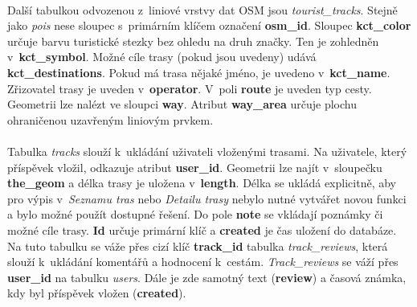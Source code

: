 \documentclass[11pt,a4paper,titlepage,oneside]{book}
\begin{document}
                        \paragraph{} Další tabulkou odvozenou z~liniové vrstvy dat \ac{OSM} jsou \textit{tourist\_tracks}. Stejně jako \textit{pois} nese sloupec s~primárním klíčem označení \textbf{osm\_id}. Sloupec \textbf{kct\_color} určuje barvu turistické stezky bez ohledu na druh značky. Ten je zohledněn v~\textbf{kct\_symbol}. Možné cíle trasy (pokud jsou uvedeny) udává \textbf{kct\_destinations}. Pokud má trasa nějaké jméno, je uvedeno v~\textbf{kct\_name}. Zřizovatel trasy je uveden v~\textbf{operator}. V~poli \textbf{route} je uveden typ cesty. Geo\-metrii lze nalézt ve sloupci \textbf{way}. Atribut \textbf{way\_area} určuje plochu ohrani\-čenou uzavřeným liniovým prvkem.



			\paragraph{} Tabulka \textit{tracks} slouží k~ukládání uživateli vloženými trasami. Na uživatele, který příspěvek vložil, odkazuje atribut \textbf{user\_id}. Geometrii lze najít v~slou\-pečku \textbf{the\_geom} a délka trasy je uložena v~\textbf{length}. Délka se ukládá explicitně, aby pro výpis v~\textit{Seznamu tras} nebo \textit{Detailu trasy} nebylo nutné vytvářet novou funkci a bylo možné použít dostupné řešení.  Do pole \textbf{note} se vkládají poznámky či možné cíle trasy. \textbf{Id} určuje primární klíč a \textbf{created} je čas uložení do databáze. Na tuto tabulku se váže přes cizí klíč \textbf{track\_id} tabulka \textit{track\_reviews}, která slouží k~ukládání komentářů a hodnocení k~cestám. \textit{Track\_reviews} se váží přes \textbf{user\_id} na tabulku \textit{users}. Dále je zde samotný text (\textbf{review}) a časová známka, kdy byl příspěvek vložen (\textbf{created}).
\end{document}
